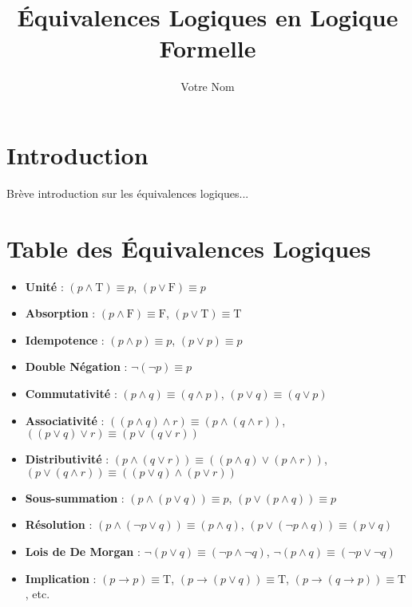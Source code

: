 \documentclass{article}
\title{Équivalences Logiques en Logique Formelle}
\author{Votre Nom}
\date{}
\begin{document}
\maketitle

\section*{Introduction}
Brève introduction sur les équivalences logiques...

\section*{Table des Équivalences Logiques}
\begin{itemize}
    \item \textbf{Unité} : \( (p \land \text{T}) \equiv p \), \( (p \lor \text{F}) \equiv p \)
    \item \textbf{Absorption} : \( (p \land \text{F}) \equiv \text{F} \), \( (p \lor \text{T}) \equiv \text{T} \)
    \item \textbf{Idempotence} : \( (p \land p) \equiv p \), \( (p \lor p) \equiv p \)
    \item \textbf{Double Négation} : \( \neg(\neg p) \equiv p \)
    \item \textbf{Commutativité} : \( (p \land q) \equiv (q \land p) \), \( (p \lor q) \equiv (q \lor p) \)
    \item \textbf{Associativité} : \( ((p \land q) \land r) \equiv (p \land (q \land r)) \), \( ((p \lor q) \lor r) \equiv (p \lor (q \lor r)) \)
    \item \textbf{Distributivité} : \( (p \land (q \lor r)) \equiv ((p \land q) \lor (p \land r)) \), \( (p \lor (q \land r)) \equiv ((p \lor q) \land (p \lor r)) \)
    \item \textbf{Sous-summation} : \( (p \land (p \lor q)) \equiv p \), \( (p \lor (p \land q)) \equiv p \)
    \item \textbf{Résolution} : \( (p \land (\neg p \lor q)) \equiv (p \land q) \), \( (p \lor (\neg p \land q)) \equiv (p \lor q) \)
    \item \textbf{Lois de De Morgan} : \( \neg(p \lor q) \equiv (\neg p \land \neg q) \), \( \neg(p \land q) \equiv (\neg p \lor \neg q) \)
    \item \textbf{Implication} : \( (p \rightarrow p) \equiv \text{T} \), \( (p \rightarrow (p \lor q)) \equiv \text{T} \), \( (p \rightarrow (q \rightarrow p)) \equiv \text{T} \), etc.
\end{itemize}
\end{document}
